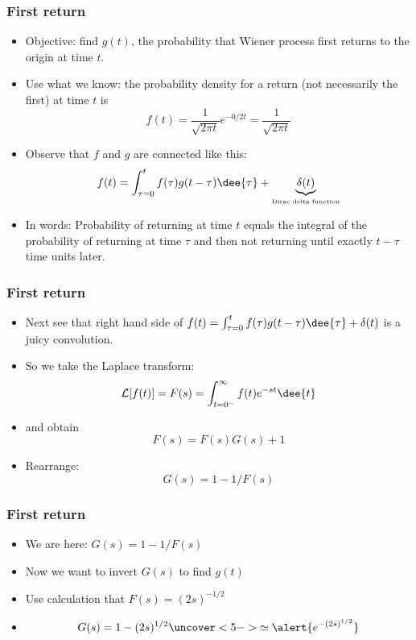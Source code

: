 \begin{frame}[label=]
  \frametitle{First return}

  \begin{itemize}
  \item<1-> \alert{Objective:} find $g(t)$, the probability
    that Wiener process first returns to the origin at time $t$.
  \item<2-> Use what we know: the probability density for
    \alert{a return} (not necessarily the first) at time $t$ is 
    $$
    f(t) = \frac{1}{\sqrt{2\pi t}} e^{-0/2t} = \frac{1}{\sqrt{2\pi t}}
    $$
  \item<3-> Observe that $f$ and $g$ are connected like this:
    $$
    f(t) = \int_{\tau=0}^{t} f(\tau) g(t - \tau) \dee{\tau} + \underbrace{\delta(t)}_{\mbox{\tiny Dirac delta function}}
    $$
  \item<4-> In words: Probability of returning at time $t$ equals
    the integral of the probability of returning at time $\tau$
    and then not returning until exactly $t-\tau$ time units later.
  \end{itemize}

\end{frame}

\begin{frame}[label=]
  \frametitle{First return}

  \begin{itemize}
  \item<1-> 
    Next see that right hand side of 
    $f(t) = \int_{\tau=0}^{t} f(\tau) g(t - \tau) \dee{\tau} + \delta(t)$
    is a juicy convolution.
  \item<2-> So we take the Laplace transform: 
    $$ 
    \mathcal{L}[f(t)] = F(s) = \int_{t=0^-}^{\infty} f(t) e^{-st} \dee{t}
    $$
  \item<3->
    and obtain 
    $$
    F(s) = F(s)G(s) + 1
    $$
  \item<4->
    Rearrange:
    $$
    G(s) = 1 - 1/F(s)
    $$
  \end{itemize}

\end{frame}

\begin{frame}[label=]
  \frametitle{First return}

  \begin{itemize}
  \item<1-> We are here: $G(s) = 1 - 1/F(s)$
  \item<2-> Now we want to invert $G(s)$ to find $g(t)$
  \item<3-> Use calculation that $F(s) = (2s)^{-1/2}$
  \item<4-> 
    $$
    G(s) = 1 - (2s)^{1/2} \uncover<5->{\simeq \alert{e^{-(2s)^{1/2}}}}
    $$
   \end{itemize}

\end{frame}

